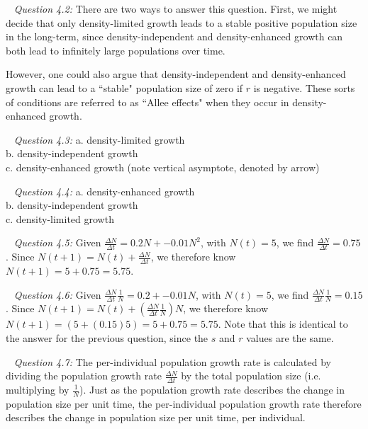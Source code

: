 \documentclass[12pt]{article}
\begin{document}
~\newline
\textit{Question 4.2:}
\newline
There are two ways to answer this question. First, we might decide that only density-limited growth leads to a stable positive population size in the long-term, since density-independent and density-enhanced growth can both lead to infinitely large populations over time.

However, one could also argue that density-independent and density-enhanced growth can lead to a ``stable" population size of zero if $r$ is negative. These sorts of conditions are referred to as ``Allee effects" when they occur in density-enhanced growth.

~\newline
\textit{Question 4.3:}
\newline
a. density-limited growth \\
b. density-independent growth \\
c. density-enhanced growth (note vertical asymptote, denoted by arrow)

~\newline
\textit{Question 4.4:}
\newline
a. density-enhanced growth \\
b. density-independent growth \\
c. density-limited growth

~\newline
\textit{Question 4.5:}
\newline
Given $\frac{\Delta N}{\Delta t} = 0.2 N + -0.01 N^2$, with $N(t) = 5$, we find $\frac{\Delta N}{\Delta t} = 0.75$.
\newline
Since $N(t+1) = N(t) + \frac{\Delta N}{\Delta t}$, we therefore know $N(t+1) = 5 + 0.75 = 5.75$.

~\newline
\textit{Question 4.6:}
\newline
Given $\frac{\Delta N}{\Delta t}\frac{1}{N} = 0.2 + -0.01 N$, with $N(t) = 5$, we find $\frac{\Delta N}{\Delta t}\frac{1}{N} = 0.15$.
\newline
Since $N(t+1) = N(t) + \left( \frac{\Delta N}{\Delta t}\frac{1}{N} \right) N$, we therefore know $N(t+1) = \left(5 + (0.15) 5 \right) = 5 + 0.75 = 5.75$. Note that this is identical to the answer for the previous question, since the $s$ and $r$ values are the same.

~\newline
\textit{Question 4.7:}
\newline
The per-individual population growth rate is calculated by dividing the population growth rate $\frac{\Delta N}{\Delta t}$ by the total population size (i.e. multiplying by $\frac{1}{N}$). Just as the population growth rate describes the change in population size per unit time, the per-individual population growth rate therefore describes the change in population size per unit time, per individual.
\end{document}

